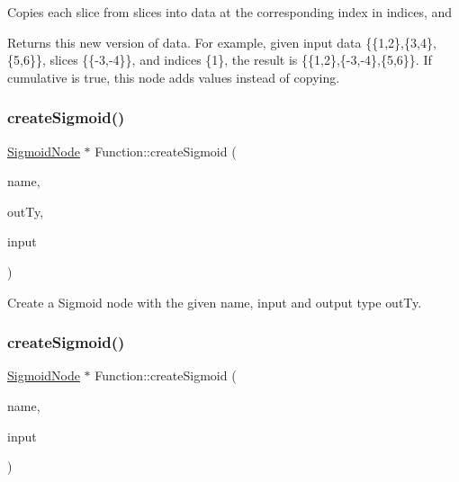 Copies each slice from {\ttfamily slices} into {\ttfamily data} at the corresponding index in {\ttfamily indices}, and \begin{DoxyReturn}{Returns}
this new version of data. For example, given input data \{\{1,2\},\{3,4\},\{5,6\}\}, slices \{\{-\/3,-\/4\}\}, and indices \{1\}, the result is \{\{1,2\},\{-\/3,-\/4\},\{5,6\}\}. If {\ttfamily cumulative} is true, this node adds values instead of copying. 
\end{DoxyReturn}
\mbox{\label{classglow_1_1_function_a8e62024d3d2033210f189b8f0fb19b04}} 
\subsubsection{\texorpdfstring{create\+Sigmoid()}{createSigmoid()}\hspace{0.1cm}{\footnotesize\ttfamily [1/2]}}
{\footnotesize\ttfamily \hyperlink{classglow_1_1_sigmoid_node}{Sigmoid\+Node} $\ast$ Function\+::create\+Sigmoid (\begin{DoxyParamCaption}\item[{llvm\+::\+String\+Ref}]{name,  }\item[{\hyperlink{structglow_1_1_type}{Type\+Ref}}]{out\+Ty,  }\item[{\hyperlink{structglow_1_1_node_value}{Node\+Value}}]{input }\end{DoxyParamCaption})}

Create a Sigmoid node with the given {\ttfamily name}, {\ttfamily input} and output type {\ttfamily out\+Ty}. \mbox{\label{classglow_1_1_function_a5493f61de698fa74ca152bbb52b212aa}} 
\subsubsection{\texorpdfstring{create\+Sigmoid()}{createSigmoid()}\hspace{0.1cm}{\footnotesize\ttfamily [2/2]}}
{\footnotesize\ttfamily \hyperlink{classglow_1_1_sigmoid_node}{Sigmoid\+Node} $\ast$ Function\+::create\+Sigmoid (\begin{DoxyParamCaption}\item[{llvm\+::\+String\+Ref}]{name,  }\item[{\hyperlink{structglow_1_1_node_value}{Node\+Value}}]{input }\end{DoxyParamCaption})}

